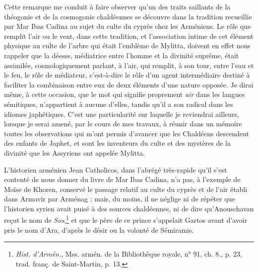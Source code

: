 \documentclass[a4paper, 11pt, oneside, polutonikogreek, french]{article}
\begin{document}
Cette remarque me conduit à faire observer qu'un des traits saillants de la théogonie et de la cosmogonie chaldéennes se découvre dans la tradition recueillie par Mar Ibas Cadina au sujet du culte du cyprès chez les Arméniens. Le rôle que remplit l'air ou le vent, dans cette tradition, et l'association intime de cet élément physique au culte de l'arbre qui était l'emblème de Mylitta, doivent en effet nous rappeler que la déesse, médiatrice entre l'homme et la divinité suprême, était assimilée, cosmologiquement parlant, à l'air, qui remplit, à son tour, entre l'eau et le feu, le rôle de médiateur, c'est-à-dire le rôle d'un agent intermédiaire destiné à faciliter la combinaison entre eux de deux éléments d'une nature opposée. Je dirai même, à cette occasion, que le mot qui signifie proprement \emph{air} dans les langues sémitiques, n'appartient à aucune d'elles, tandis qu'il a son radical dans les idiomes japhétiques. C'est une particularité sur laquelle je reviendrai ailleurs, lorsque je serai amené, par le cours de mes travaux, à réunir dans un mémoire toutes les observations qui m'ont permis d'avancer que les Chaldéens descendent des enfants de Japhet, et sont les inventeurs du culte et des mystères de la divinité que les Assyriens ont appelée Mylitta.

L'historien arménien Jean Catholicos, dans l'abrégé très-rapide qu'il s'est contenté de nous donner du livre de Mar Ibas Cadina, n'a pas, à l'exemple de Moïse de Khoren, conservé le passage relatif au culte du cyprès et de l'air établi dans Armavir par Arménag ; mais, du moins, il ne néglige ni de répéter que l'historien syrien avait puisé à des sources chaldéennes, ni de dire qu'Anouschavan reçut le nom de \emph{Sos},\footnote{\emph{Hist. d'Armén.}, Mss. armén. de la Bibliothèque royale, n° 91, ch. 8., p. 23, trad. franç. de Saint-Martin, p. 13.} et que le père de ce prince s'appelait Gartos avant d'avoir pris le nom d'Ara, d'après le désir ou la volonté de Sémiramis.
\end{document}
